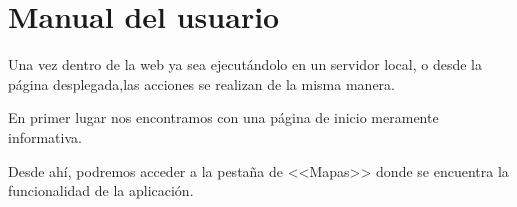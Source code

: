 %
%

\section{Manual del usuario}

Una vez dentro de la web ya sea ejecutándolo en un servidor local, o desde
la página desplegada,las acciones se realizan de la misma manera.

En primer lugar nos encontramos con una página de inicio meramente informativa.

\label{pagina_inicio}

Desde ahí, podremos acceder a la pestaña de <<Mapas>> donde se encuentra la funcionalidad de la aplicación.

\label{pagina_mapas_web}

